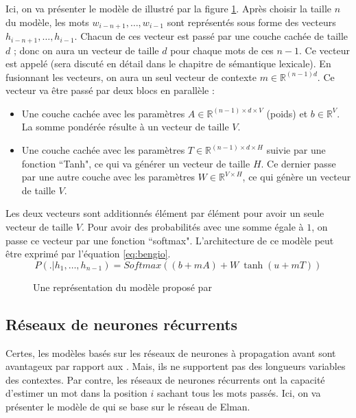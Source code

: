 \documentclass{KodeBook}
\begin{document}
Ici, on va présenter le modèle de \citet{2003-bengio-al} illustré par la figure \ref{fig:bengio-l}.
Après choisir la taille $n$ du modèle, les mots $w_{i-n+1}, \ldots, w_{i-1}$ sont représentés sous forme des vecteurs  $h_{i-n+1}, \ldots, h_{i-1}$. 
Chacun de ces vecteur est passé par une couche cachée de taille $d$ ; donc on aura un vecteur de taille $d$ pour chaque mots de ces $n-1$.
Ce vecteur est appelé  (sera discuté en détail dans le chapitre de sémantique lexicale). 
En fusionnant les vecteurs, on aura un seul vecteur de contexte $m \in \mathbb{R}^{(n-1) d}$.
Ce vecteur va être passé par deux blocs en parallèle :
\begin{itemize}
	\item Une couche cachée avec les paramètres $A \in \mathbb{R}^{(n-1) \times d \times V}$ (poids) et $b \in \mathbb{R}^{V}$. 
	La somme pondérée résulte à un vecteur de taille $V$. 
	\item Une couche cachée avec les paramètres $T \in \mathbb{R}^{(n-1) \times d \times H}$ suivie par une fonction ``Tanh", ce qui va générer un vecteur de taille $H$. 
	Ce dernier passe par une autre couche avec les paramètres $W \in \mathbb{R}^{V \times H}$, ce qui génère un vecteur de taille $V$. 
\end{itemize}
Les deux vecteurs sont additionnés élément par élément pour avoir un seule vecteur de taille $V$. 
Pour avoir des probabilités avec une somme égale à $1$, on passe ce vecteur par une fonction ``softmax". 
L'architecture de ce modèle peut être exprimé par l'équation \ref{eq:bengio}.
\begin{equation}
	P(.|h_1,\ldots, h_{n-1}) = 
	Softmax \left(
	(b + m A) 
	+ 
	W\ \tanh(u + m T)
	\right)
	\label{eq:bengio}
\end{equation}

\begin{figure}[ht]
	\centering
	\caption[Modèle de langage à base des réseaux de neurones à propagation avant]{Une représentation du modèle proposé par \cite{2003-bengio-al}\label{fig:bengio-l}}
\end{figure}

\subsection{Réseaux de neurones récurrents}

Certes, les modèles basés sur les réseaux de neurones à propagation avant sont avantageux par rapport aux .
Mais, ils ne supportent pas des longueurs variables des contextes.
Par contre, les réseaux de neurones récurrents ont la capacité d'estimer un mot dans la position $i$ sachant tous les mots passés.
Ici, on va présenter le modèle de \citet{2010-mokolov-al} qui se base sur le réseau de Elman.
\end{document}
